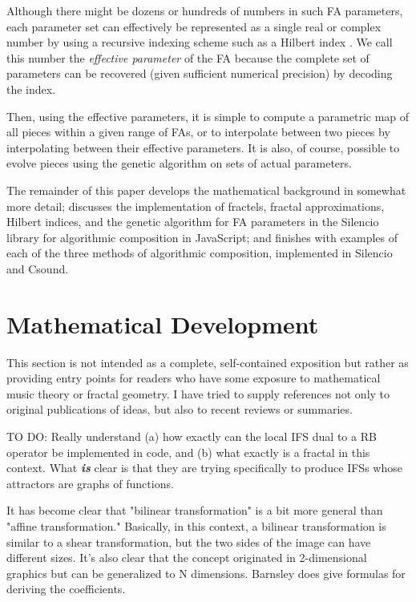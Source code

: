 \documentclass[english,11pt,letterpaper,onecolumn]{scrartcl}
\numberwithin{equation}{section}
\begin{document}
Although there might be dozens or hundreds of numbers in such FA parameters,
each parameter set can effectively be represented as a single real or complex
number by using a recursive indexing scheme such as a Hilbert index
\cite{hamilton2006compact}. We call this number the \textit{effective parameter}
of the FA because the complete set of parameters can be recovered (given
sufficient numerical precision) by decoding the index.

Then, using the effective parameters, it is simple to compute a parametric map
of all pieces within a given range of FAs, or to interpolate between two pieces
by interpolating between their effective parameters. It is also, of course,
possible to evolve pieces using the genetic algorithm on sets of actual
parameters.

The remainder of this paper develops the mathematical background in somewhat
more detail; discusses the implementation of fractels, fractal approximations,
Hilbert indices, and the genetic algorithm for FA parameters in the Silencio
library for algorithmic composition in JavaScript; and finishes with examples of
each of the three methods of algorithmic composition, implemented in Silencio
and Csound.

\section{Mathematical Development}

This section is not intended as a complete, self-contained exposition but rather
as providing entry points for readers who have some exposure to mathematical
music theory or fractal geometry. I have tried to supply references not only to
original publications of ideas, but also to recent reviews or summaries.

TO DO: Really understand (a) how exactly can the local IFS dual to a RB operator
be implemented in code, and (b) what exactly is a fractal in this context. What
\textit{\textbf{is}} clear is that they are trying specifically to produce IFSs
whose attractors are graphs of functions.

It has become clear that "bilinear transformation" is a bit more general than
"affine transformation." Basically, in this context, a bilinear transformation
is similar to a shear transformation, but the two sides of the image can have
different sizes. It's also clear that the concept originated in 2-dimensional
graphics but can be generalized to N dimensions. Barnsley does give formulas for
deriving the coefficients.
\end{document}
